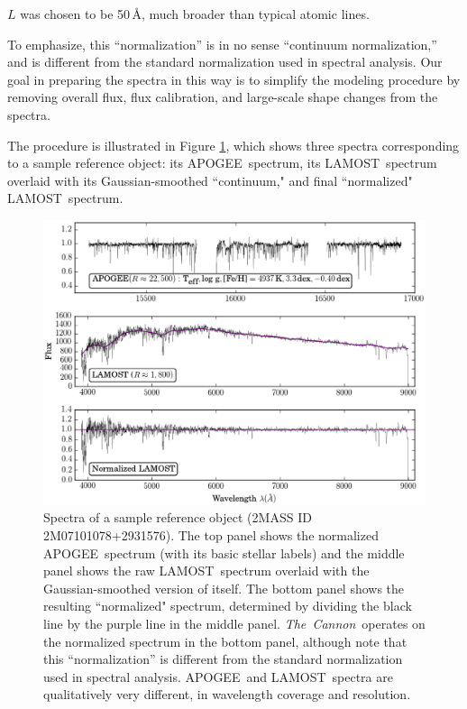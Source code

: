 \documentclass[12pt, letterpaper, preprint]{aastex}
\newcommand{\tc}{\textsl{The~Cannon}}
\newcommand{\apogee}{APOGEE}
\newcommand{\lamost}{LAMOST}
\begin{document}
\noindent $L$ was chosen to be 50\,$\mbox{\AA}$,
much broader than typical atomic lines. 

To emphasize, this ``normalization'' is in no sense
``continuum normalization,'' and is
different from the standard normalization used in
spectral analysis. Our goal in preparing the spectra in this way is to simplify the modeling procedure by removing overall flux, flux calibration, and large-scale shape changes from the spectra.

The procedure is illustrated in Figure \ref{fig:sample_spec}, 
which shows three spectra corresponding to a sample reference object: 
its \apogee\ spectrum, its \lamost\ spectrum overlaid with its Gaussian-smoothed  ``continuum," and final ``normalized" \lamost\ spectrum. 

\begin{figure}[!p]
\centering
\includegraphics[scale=0.85]{f2.eps}
\caption{Spectra of a sample reference object (2MASS ID 2M07101078+2931576).
The top panel shows the normalized \apogee\ spectrum (with its basic stellar labels) and the middle panel shows
the raw \lamost\ spectrum overlaid with the Gaussian-smoothed version of itself. 
The bottom panel shows the resulting ``normalized" spectrum, determined by
dividing the black line by the purple line in the middle panel. \tc\ operates on the normalized
spectrum in the bottom panel, although note that this ``normalization'' is different from the standard normalization used in spectral analysis. 
\apogee\ and \lamost\ spectra are qualitatively 
very different, in wavelength coverage and resolution.}
\label{fig:sample_spec}
\end{figure}
\end{document}
